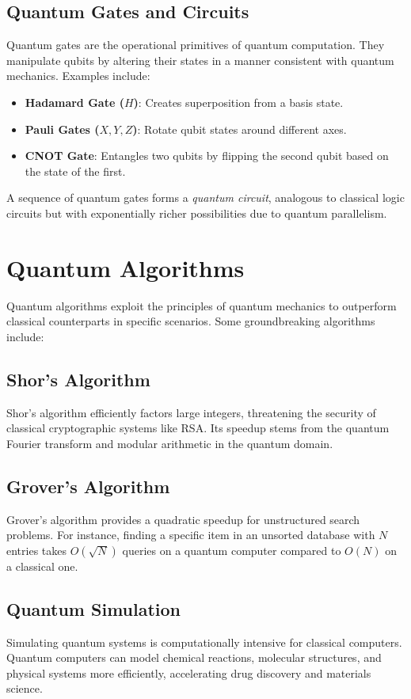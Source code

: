 \documentclass[11pt]{article}
\theoremstyle{definition}
\begin{document}
\subsection*{Quantum Gates and Circuits}
Quantum gates are the operational primitives of quantum computation. They manipulate qubits by altering their states in a manner consistent with quantum mechanics. Examples include:
\begin{itemize}
    \item \textbf{Hadamard Gate ($H$)}: Creates superposition from a basis state.
    \item \textbf{Pauli Gates ($X, Y, Z$)}: Rotate qubit states around different axes.
    \item \textbf{CNOT Gate}: Entangles two qubits by flipping the second qubit based on the state of the first.
\end{itemize}
A sequence of quantum gates forms a \textit{quantum circuit}, analogous to classical logic circuits but with exponentially richer possibilities due to quantum parallelism.

\section*{Quantum Algorithms}
Quantum algorithms exploit the principles of quantum mechanics to outperform classical counterparts in specific scenarios. Some groundbreaking algorithms include:

\subsection*{Shor's Algorithm}
Shor's algorithm efficiently factors large integers, threatening the security of classical cryptographic systems like RSA. Its speedup stems from the quantum Fourier transform and modular arithmetic in the quantum domain.

\subsection*{Grover's Algorithm}
Grover's algorithm provides a quadratic speedup for unstructured search problems. For instance, finding a specific item in an unsorted database with $N$ entries takes $O(\sqrt{N})$ queries on a quantum computer compared to $O(N)$ on a classical one.

\subsection*{Quantum Simulation}
Simulating quantum systems is computationally intensive for classical computers. Quantum computers can model chemical reactions, molecular structures, and physical systems more efficiently, accelerating drug discovery and materials science.
\end{document}
